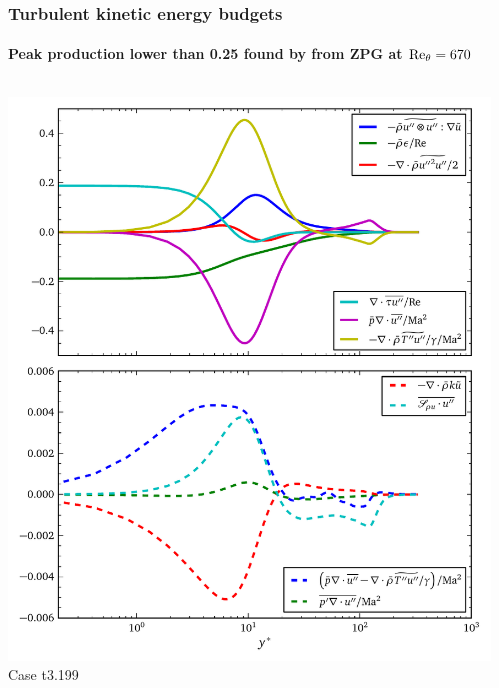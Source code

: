 \documentclass[mathserif]{beamer}
\begin{document}
\begin{frame}
    \frametitle{Turbulent kinetic energy budgets}
    \framesubtitle{%
        Peak production lower than 0.25 found by \citet{Schlatter2009Turbulent} from ZPG at $\Reynolds[\theta]{}=670$
    }
    \begin{columns}
        \begin{column}{0.5\linewidth}
          \centering
          \includegraphics[width=\textwidth]{hqd_tke_t3199}
          \\\vspace{-0.5em}
          Case t3.199
        \end{column}
        \begin{column}{0.5\linewidth}
          \centering

\end{column}
\end{columns}
\end{frame}
\end{document}
